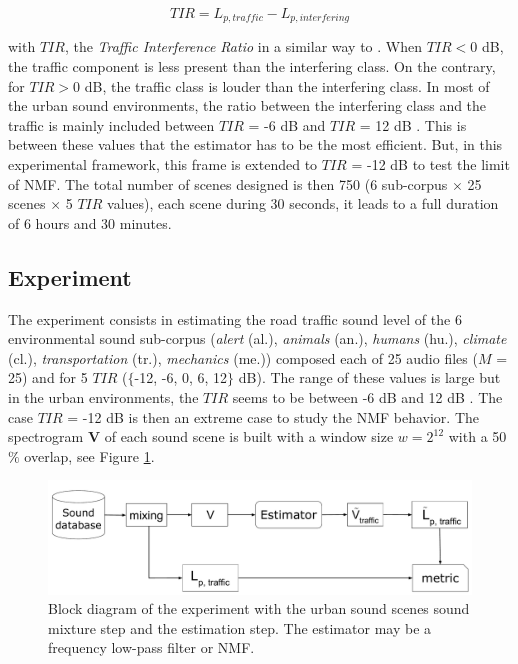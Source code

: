 \documentclass[twocolumn]{svjour3}          %
\begin{document}
\begin{equation}\label{eq:tir}
TIR = L_{p,traffic}-L_{p,interfering}
\end{equation}

with $TIR$, the \textit{Traffic Interference Ratio} in a similar way to \cite{dikmen2013sound}. When $TIR < 0$ dB, the traffic component is less present than the interfering class. On the contrary, for $TIR > 0$ dB, the traffic class is louder than the interfering class.
In most of the urban sound environments, the ratio between the interfering class and the traffic is mainly included between $TIR$ = -6 dB and $TIR$ = 12 dB \cite{gloaguen_creation_2017}. This is between these values that the estimator has to be the most efficient. But, in this experimental framework, this frame is extended to $TIR$ = -12 dB to test the limit of NMF. The total number of scenes designed is then 750 (6 sub-corpus $\times$ 25 scenes $\times$  5 $TIR$ values), each scene during 30 seconds, it leads to a full duration of 6 hours and 30 minutes.

\subsection{Experiment}

The experiment consists in estimating the road traffic sound level of the 6 environmental sound sub-corpus (\textit{alert} (al.), \textit{animals} (an.), \textit{humans} (hu.), \textit{climate} (cl.), \textit{transportation} (tr.), \textit{mechanics} (me.)) composed each of 25 audio files ($M$ = 25) and for 5 $TIR$ ($\lbrace$-12, -6, 0, 6, 12$\rbrace$ dB). The range of these values is large but in the urban environments, the $TIR$ seems to be between -6 dB and 12 dB \cite{gloaguen_creation_2017}. The case $TIR$ = -12 dB is then an extreme case to study the NMF behavior.
The spectrogram $\mathbf{V}$ of each sound scene is built with a window size $w = 2^{12}$ with a 50 $\%$ overlap, see Figure \ref{fig:bloc_experiment}.

\begin{figure}
    \centering
    \includegraphics[width=\linewidth]{figures/bloc_diagram_estimator.pdf}
    \caption{Block diagram of the experiment with the urban sound scenes sound mixture step and the estimation step. The estimator may be a frequency low-pass filter or NMF.}
    \label{fig:bloc_experiment}
\end{figure}
\end{document}
